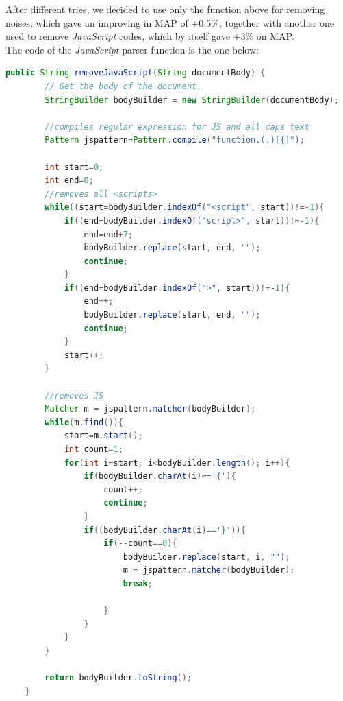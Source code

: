 After different tries, we decided to use only the function above for removing noises, which gave an improving in \ac{MAP} of +0.5\%, together with another one used to remove \textit{JavaScript} codes, which by itself gave +3\% on \ac{MAP}. \\
The code of the \textit{JavaScript} parser function is the one below:
\begin{lstlisting}[language=Java]
    public String removeJavaScript(String documentBody) {
        // Get the body of the document.
        StringBuilder bodyBuilder = new StringBuilder(documentBody);

        //compiles regular expression for JS and all caps text
        Pattern jspattern=Pattern.compile("function.(.)[{]");

        int start=0;
        int end=0;
        //removes all <scripts>
        while((start=bodyBuilder.indexOf("<script", start))!=-1){
            if((end=bodyBuilder.indexOf("script>", start))!=-1){
                end=end+7;
                bodyBuilder.replace(start, end, "");
                continue;
            }
            if((end=bodyBuilder.indexOf(">", start))!=-1){
                end++;
                bodyBuilder.replace(start, end, "");
                continue;
            }
            start++;
        }

        //removes JS
        Matcher m = jspattern.matcher(bodyBuilder);
        while(m.find()){
            start=m.start();
            int count=1;
            for(int i=start; i<bodyBuilder.length(); i++){
                if(bodyBuilder.charAt(i)=='{'){
                    count++;
                    continue;
                }
                if((bodyBuilder.charAt(i)=='}')){
                    if(--count==0){
                        bodyBuilder.replace(start, i, "");
                        m = jspattern.matcher(bodyBuilder);
                        break;

                    }
                }
            }
        }

        return bodyBuilder.toString();
    }
\end{lstlisting}

